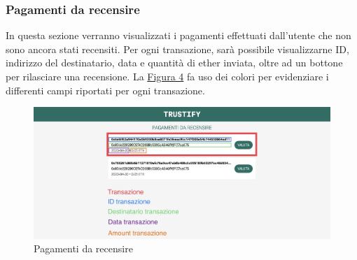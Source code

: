 \subsubsection{Pagamenti da recensire}
In questa sezione verranno visualizzati i pagamenti effettuati dall'utente che non sono ancora stati recensiti. Per ogni transazione, sarà possibile visualizzarne ID, indirizzo del destinatario, data e quantità di ether inviata, oltre ad un bottone per rilasciare una recensione. La \hyperref[fig:pagamenti]{Figura 4} fa uso dei colori per evidenziare i differenti campi riportati per ogni transazione.
\begin{figure}[H]
    \includegraphics[width=\linewidth]{src/img/pagamenti.jpeg}
    \caption[Pagamenti da recensire]{Pagamenti da recensire\protect\footnotemark}\label{fig:pagamenti}
\end{figure}

\pagebreak

